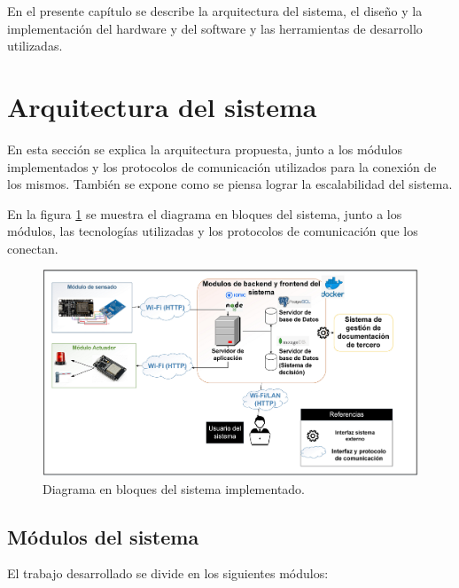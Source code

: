 En el presente capítulo se describe la arquitectura del sistema, el diseño y la implementación del hardware y del software y las herramientas de desarrollo utilizadas. 


\section{Arquitectura del sistema}

En esta sección se explica la arquitectura propuesta, junto a los módulos implementados y los protocolos de comunicación utilizados para la conexión de los mismos. También se expone como se piensa lograr la escalabilidad del sistema.

En la figura \ref{fig:tp-final-infra} se muestra el diagrama en bloques del sistema, junto a los módulos, las tecnologías utilizadas y los protocolos de comunicación que los conectan.

\vspace{0.7cm}
\begin{figure}[ht]
	\centering
	\includegraphics[width=1\textwidth]{./Figures/tp-final-infra.png}
	\caption{Diagrama en bloques del sistema implementado.}
	\label{fig:tp-final-infra}
\end{figure}

\pagebreak
\subsection{Módulos del sistema}

El trabajo desarrollado se divide en los siguientes módulos:

